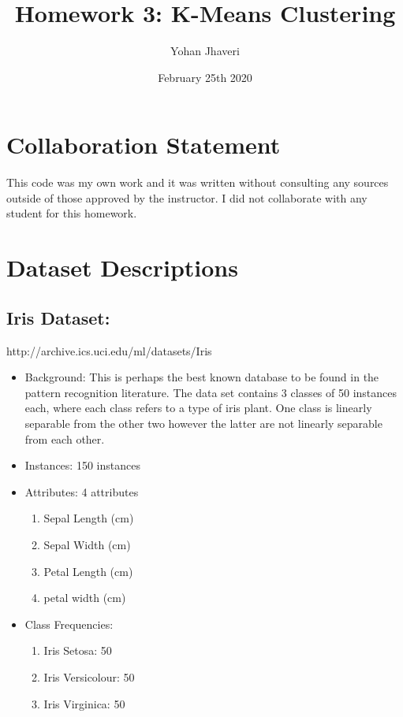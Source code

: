 \documentclass{article}
\title{Homework 3: K-Means Clustering}
\author{Yohan Jhaveri}
\date{February 25th 2020}
\begin{document}
\maketitle

\section{Collaboration Statement}
This code was my own work and it was written without consulting any sources outside of those approved by the instructor. I did not collaborate with any student for this homework.


\section{Dataset Descriptions}
\subsection{Iris Dataset:}
http://archive.ics.uci.edu/ml/datasets/Iris
\begin{itemize}
\item Background: This is perhaps the best known database to be found in the pattern recognition literature. The data set contains 3 classes of 50 instances each, where each class refers to a type of iris plant. One class is linearly separable from the other two however the latter are not linearly separable from each other.

\item Instances: 150 instances 
\item Attributes: 4 attributes
\begin{enumerate}
    \item Sepal Length (cm)
    \item Sepal Width (cm)
    \item Petal Length (cm)
    \item petal width (cm)
\end{enumerate}
\item Class Frequencies: 
\begin{enumerate}
    \item Iris Setosa: 50
    \item Iris Versicolour: 50
    \item Iris Virginica: 50
\end{enumerate}
\end{itemize}
\end{document}
